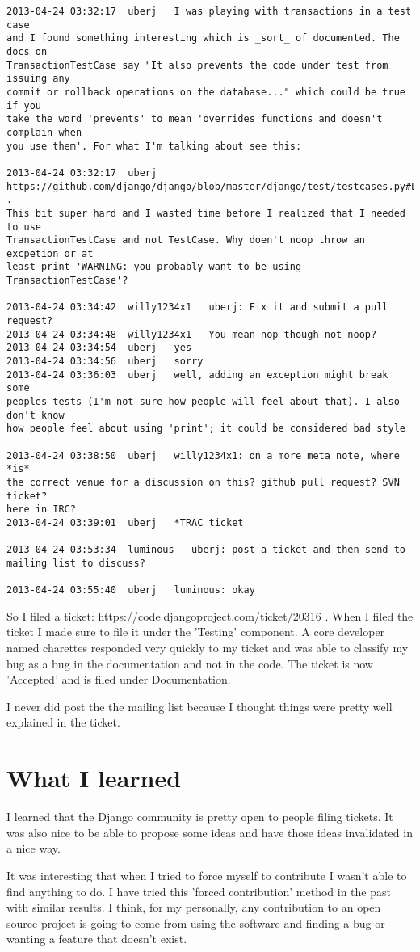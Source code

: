 \documentclass[12pt]{article}
\begin{document}
\begin{lstlisting}
2013-04-24 03:32:17  uberj   I was playing with transactions in a test case
and I found something interesting which is _sort_ of documented. The docs on
TransactionTestCase say "It also prevents the code under test from issuing any
commit or rollback operations on the database..." which could be true if you
take the word 'prevents' to mean 'overrides functions and doesn't complain when
you use them'. For what I'm talking about see this:

2013-04-24 03:32:17  uberj
https://github.com/django/django/blob/master/django/test/testcases.py#L75 .
This bit super hard and I wasted time before I realized that I needed to use
TransactionTestCase and not TestCase. Why doen't noop throw an excpetion or at
least print 'WARNING: you probably want to be using TransactionTestCase'?

2013-04-24 03:34:42  willy1234x1   uberj: Fix it and submit a pull request?
2013-04-24 03:34:48  willy1234x1   You mean nop though not noop?
2013-04-24 03:34:54  uberj   yes
2013-04-24 03:34:56  uberj   sorry
2013-04-24 03:36:03  uberj   well, adding an exception might break some
peoples tests (I'm not sure how people will feel about that). I also don't know
how people feel about using 'print'; it could be considered bad style

2013-04-24 03:38:50  uberj   willy1234x1: on a more meta note, where *is*
the correct venue for a discussion on this? github pull request? SVN ticket?
here in IRC?
2013-04-24 03:39:01  uberj   *TRAC ticket

2013-04-24 03:53:34  luminous   uberj: post a ticket and then send to
mailing list to discuss?

2013-04-24 03:55:40  uberj   luminous: okay
\end{lstlisting}

So I filed a ticket: https://code.djangoproject.com/ticket/20316 . When I
filed the ticket I made sure to file it under the 'Testing' component. A core
developer named charettes responded very quickly to my ticket and was able to
classify my bug as a bug in the documentation and not in the code. The ticket
is now 'Accepted' and is filed under Documentation.

I never did post the the mailing list because I thought things were pretty well
explained in the ticket.

\section{What I learned}
I learned that the Django community is pretty open to people filing tickets. It
was also nice to be able to propose some ideas and have those ideas invalidated
in a nice way.

It was interesting that when I tried to force myself to contribute I
wasn't able to find anything to do. I have tried this 'forced
contribution' method in the past with similar results. I think, for my
personally, any contribution to an open source project is going to come from
using the software and finding a bug or wanting a feature that doesn't exist.
\end{document}
